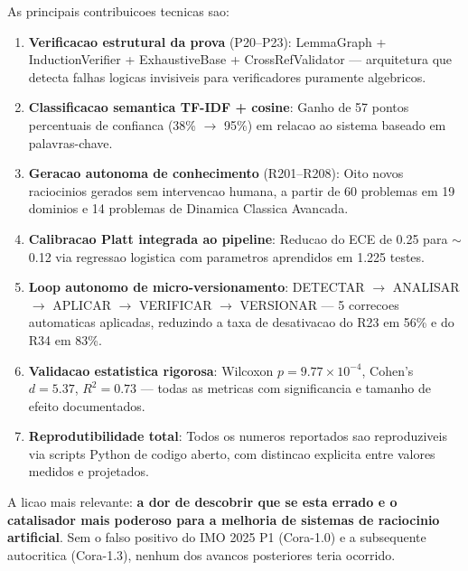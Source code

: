 \documentclass[5p]{elsarticle}
\begin{document}
As principais contribuicoes tecnicas sao:

\begin{enumerate}[label=\textbf{(\roman*)}]
  \item \textbf{Verificacao estrutural da prova} (P20--P23): LemmaGraph +
        InductionVerifier + ExhaustiveBase + CrossRefValidator --- arquitetura
        que detecta falhas logicas invisiveis para verificadores puramente
        algebricos.

  \item \textbf{Classificacao semantica TF-IDF + cosine}: Ganho de 57 pontos
        percentuais de confianca (38\% $\to$ 95\%) em relacao ao sistema
        baseado em palavras-chave.

  \item \textbf{Geracao autonoma de conhecimento} (R201--R208): Oito novos
        raciocinios gerados sem intervencao humana, a partir de 60 problemas
        em 19 dominios e 14 problemas de Dinamica Classica Avancada.

  \item \textbf{Calibracao Platt integrada ao pipeline}: Reducao do ECE de
        0.25 para $\sim$0.12 via regressao logistica com parametros aprendidos
        em 1.225 testes.

  \item \textbf{Loop autonomo de micro-versionamento}: DETECTAR $\to$ ANALISAR
        $\to$ APLICAR $\to$ VERIFICAR $\to$ VERSIONAR --- 5 correcoes
        automaticas aplicadas, reduzindo a taxa de desativacao do R23 em 56\%
        e do R34 em 83\%.

  \item \textbf{Validacao estatistica rigorosa}: Wilcoxon $p = 9.77 \times
        10^{-4}$, Cohen's $d = 5.37$, $R^2 = 0.73$ --- todas as metricas com
        significancia e tamanho de efeito documentados.

  \item \textbf{Reprodutibilidade total}: Todos os numeros reportados sao
        reproduziveis via scripts Python de codigo aberto, com distincao
        explicita entre valores medidos e projetados.
\end{enumerate}

A licao mais relevante: \textbf{a dor de descobrir que se esta errado e o
catalisador mais poderoso para a melhoria de sistemas de raciocinio artificial}.
Sem o falso positivo do IMO 2025 P1 (Cora-1.0) e a subsequente autocritica
(Cora-1.3), nenhum dos avancos posteriores teria ocorrido.
\end{document}
